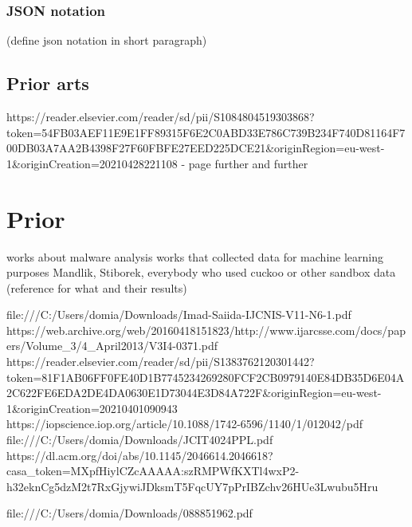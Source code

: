 \subsubsection{JSON notation} \label{sec:json_notation}
(define json notation in short paragraph)

\subsection{Prior arts}
https://reader.elsevier.com/reader/sd/pii/S1084804519303868?token=54FB03AEF11E9E1FF89315F6E2C0ABD33E786C739B234F740D81164F700DB03A7AA2B4398F27F60FBFE27EED225DCE21&originRegion=eu-west-1&originCreation=20210428221108 - page further and further


\section{Prior}
works about malware analysis
works that collected data for machine learning purposes
Mandlik, Stiborek, everybody who used cuckoo or other sandbox data (reference for what and their results)

file:///C:/Users/domia/Downloads/Imad-Saiida-IJCNIS-V11-N6-1.pdf
https://web.archive.org/web/20160418151823/http://www.ijarcsse.com/docs/papers/Volume_3/4_April2013/V3I4-0371.pdf
https://reader.elsevier.com/reader/sd/pii/S1383762120301442?token=81F1AB06FF0FE40D1B7745234269280FCF2CB0979140E84DB35D6E04A2C622FE6EDA2DE4DA0630E1D73044E3D84A722F&originRegion=eu-west-1&originCreation=20210401090943
https://iopscience.iop.org/article/10.1088/1742-6596/1140/1/012042/pdf
file:///C:/Users/domia/Downloads/JCIT4024PPL.pdf
https://dl.acm.org/doi/abs/10.1145/2046614.2046618?casa_token=MXpfHiylCZcAAAAA:szRMPWfKXTl4wxP2-h32eknCg5dzM2t7RxGjywiJDksmT5FqcUY7pPrIBZchv26HUe3Lwubu5Hru

file:///C:/Users/domia/Downloads/088851962.pdf









